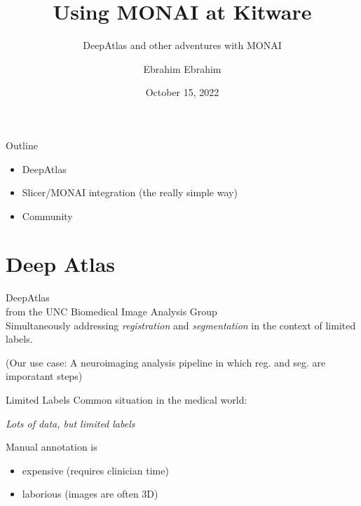 \documentclass[10pt,aspectratio=169,dvipsnames]{beamer}
\title{Using MONAI at Kitware}
\subtitle{DeepAtlas and other adventures with MONAI}
\date{October 15, 2022}
\author{Ebrahim Ebrahim}
\begin{document}
\maketitle








\begin{frame}{Outline}
\begin{itemize}\itemsep1em
\item DeepAtlas
\item Slicer/MONAI integration (the really simple way)
\item Community
\end{itemize}
\end{frame}


\section{Deep Atlas}

\begin{frame}{DeepAtlas}
\\
\vspace{2em}
from the UNC Biomedical Image Analysis Group\\
\vspace{2em}
Simultaneously addressing \emph{registration} and \emph{segmentation} in the context of limited labels.

\pause
(Our use case: A neuroimaging analysis pipeline in which reg. and seg. are imporatant steps)
\end{frame}

\begin{frame}{Limited Labels}
Common situation in the medical world:
\begin{center}
\emph{Lots of data, but limited labels}
\end{center}
\pause
Manual annotation is
\begin{itemize}
\item expensive (requires clinician time)
\item laborious (images are often 3D)
\end{itemize}
\end{frame}
\end{document}
